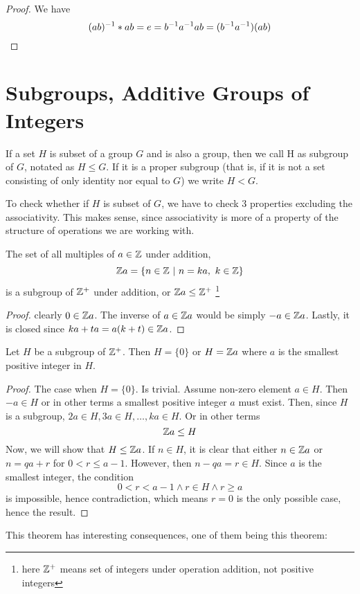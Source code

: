 \begin{proof}
    We have
    \[ (ab) ^{-1} \ast ab = e = b^{-1} a ^{-1} ab  = (b ^{-1} a ^{-1}) (ab)\]
\end{proof}
\section{Subgroups, Additive Groups of Integers}
\begin{definition*}
    If a set $H$ is subset of a group $G$ and is also a group, then we call H as \alert{subgroup} of $G$, notated as $ H \le G$. If it is a
    proper subgroup (that is, if it is not a set consisting of only identity nor equal to $G$) we write $H < G$.
\end{definition*}
To check whether if $H$ is subset of $G$, we have to check $3$ properties excluding the associativity. This makes sense, since
associativity is more of a property of the structure of operations we are working with.
\begin{example*}
    The set of all multiples of $a \in \mathbb Z$ under addition,
    \[\mathbb Z a = \{ n \in \mathbb Z \ | \ n = ka, \ k \in \mathbb Z\} \]
    is a subgroup of $\mathbb Z^+$ under addition, or $\mathbb Z a \le \mathbb Z^+$
    \footnote{here $\mathbb Z^+$ means set of integers under operation addition, not positive integers}
\end{example*}
\begin{proof} clearly $0 \in  \mathbb Z a$. The inverse of $a \in \mathbb Z a$ would be simply $-a \in \mathbb Z a$. Lastly, it is closed since $ka + ta =
    a(k+t) \in \mathbb Z a$.
\end{proof}

\begin{theorem} Let $H$ be a subgroup of $\mathbb Z^+$. Then $H = \{ 0\}$ or $H = \mathbb Z a$ where $a$ is the smallest positive integer in $H$.
\end{theorem}
\begin{proof}
    The case when $H= \{ 0\}$. Is trivial. Assume non-zero element $a \in H$. Then $-a \in H$ or in other terms a smallest positive integer
    $a$ must exist. Then, since $H$ is a subgroup, $2a \in H, 3a \in H, \ldots, ka \in H$. Or in other terms
    \[ \mathbb Z a \le H\]
    Now, we will show that $ H \le \mathbb Z a$. If $n \in H$, it is clear that either $n \in \mathbb Z a$ or $n = qa + r$ for $0 < r \le a-1$.
    However, then $n - qa = r \in H$. Since $a$ is the smallest integer, the condition
    \[ 0 < r < a-1  \land r \in H \land r \ge a\]
    is impossible, hence contradiction, which means $r=0$ is the only possible case, hence the result.
\end{proof}
This theorem has interesting consequences, one of them being this theorem:


